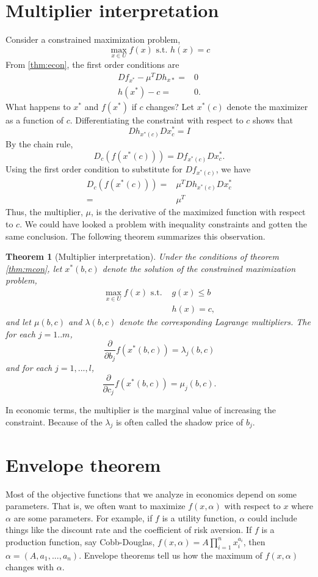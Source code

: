 \documentclass[12pt,reqno]{amsart}
\newtheorem{theorem}{Theorem}[section]
\theoremstyle{definition}
\begin{document}
\section{Multiplier interpretation}

Consider a constrained maximization problem,
\[ \max_{x \in U} f(x) \text{ s.t. } h(x) = c \]
From \ref{thm:econ}, the first order conditions are
\begin{align*}
 Df_{x^*} - \mu^T Dh_{x*} = & 0 \\
 h(x^*) - c = & 0.
\end{align*}
What happens to $x^*$ and $f(x^*)$ if $c$ changes? Let $x^*(c)$ denote
the maximizer as a function of $c$. Differentiating the constraint
with respect to $c$ shows that
\[ Dh_{x^*(c)} Dx^*_c = I \]
By the chain rule,
\[ D_c \left( f(x^*(c)) \right) = Df_{x^*(c)} Dx^*_c. \] 
Using the first order condition to substitute for $Df_{x^*(c)}$, we
have
\begin{align*}
  D_c \left( f(x^*(c)) \right) = & \mu^T Dh_{x^*(c)}Dx^*_c \\
  = & \mu^T 
\end{align*}
Thus, the multiplier, $\mu$, is the derivative of the maximized
function with respect to $c$.  We could have looked a
problem with inequality constraints and gotten the same
conclusion. The following theorem summarizes this observation.
\begin{theorem}[Multiplier interpretation]\label{thm:muint} 
  Under the conditions of theorem \ref{thm:mcon}, let $x^*(b,c)$
  denote the solution of the constrained maximization problem,
  \begin{align*}
    \max_{x \in U} f(x) \text{ s.t. } & g(x) \leq b \\
    & h(x) = c ,
  \end{align*}
  and let $\mu(b,c)$ and $\lambda(b,c)$ denote the corresponding
  Lagrange multipliers. The for each $j=1..m$,
  \[ \frac{\partial}{\partial b_j} f(x^*(b,c)) = \lambda_j(b,c) \]
  and for each $j=1,...,l$,
  \[ \frac{\partial}{\partial c_j} f(x^*(b,c)) = \mu_j(b,c). \]
\end{theorem} 
In economic terms, the multiplier is the
marginal value of increasing the constraint. Because of the
$\lambda_j$ is often called the shadow price of $b_j$. 

\section{Envelope theorem}

Most of the objective functions that we analyze in economics depend on
some parameters. That is, we often want to maximize $f(x,\alpha)$ with
respect to $x$ where $\alpha$ are some parameters. For example, if $f$ is a
utility function, $\alpha$ could include things like the discount rate and
the coefficient of risk aversion. If $f$ is a production function, say
Cobb-Douglas, $f(x,\alpha) = A \prod_{i=1}^n x_i^{a_i}$, then $\alpha
= (A,a_1,...,a_n)$. Envelope theorems tell us how the maximum of
$f(x,\alpha)$ changes with $\alpha$. 
\end{document}
